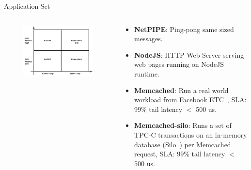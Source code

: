 \documentclass[notes=only,10pt,xcolor=table]{beamer}
\begin{document}
\begin{frame}{Application Set}
\begin{columns}
    \begin{column}{.5\textwidth}
        \begin{figure}
            \includegraphics[width=1\textwidth]{img/workload_fig.pdf}
        \end{figure}
    \end{column}
    \begin{column}{.5\textwidth}
        \begin{itemize}
            \item \textbf{NetPIPE}: Ping-pong same sized messages.
            \item \textbf{NodeJS}: HTTP Web Server serving web pages running on NodeJS runtime.
            \item \textbf{Memcached}: Run a real world workload from Facebook ETC~\cite{workloadanalysisfacebook}, SLA: 99\% tail latency $<$ 500 us.
            \item \textbf{Memcached-silo}: Runs a set of TPC-C transactions on an in-memory database (Silo~\cite{silo}) per Memcached request, SLA: 99\% tail latency $<$ 500 us.
        \end{itemize}
    \end{column}
\end{columns}
\end{frame}
\end{document}
